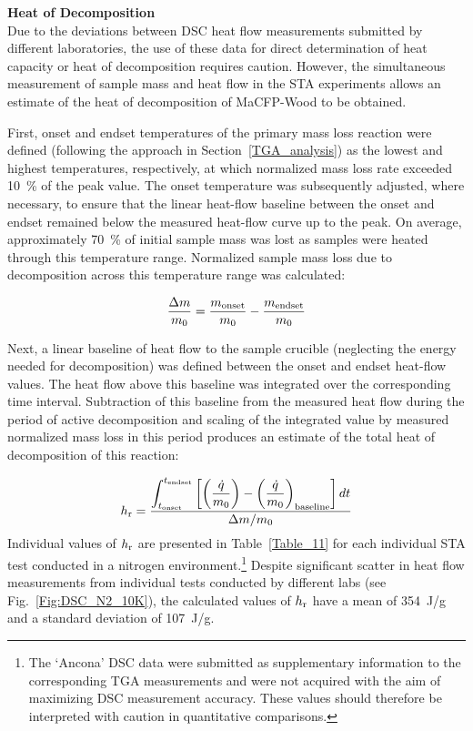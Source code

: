 \documentclass{book}
\begin{document}

\textbf{Heat of Decomposition} \\
Due to the deviations between DSC heat flow measurements submitted by different laboratories, the use of these data for direct determination of heat capacity or heat of decomposition requires caution. However, the simultaneous measurement of sample mass and heat flow in the STA experiments allows an estimate of the heat of decomposition of MaCFP-Wood to be obtained.

First, onset and endset temperatures of the primary mass loss reaction were defined (following the approach in Section~\ref{TGA_analysis}) as the lowest and highest temperatures, respectively, at which normalized mass loss rate exceeded 10~\% of the peak value. The onset temperature was subsequently adjusted, where necessary, to ensure that the linear heat-flow baseline between the onset and endset remained below the measured heat-flow curve up to the peak. On average, approximately 70~\% of initial sample mass was lost as samples were heated through this temperature range. Normalized sample mass loss due to decomposition across this temperature range was calculated:

\begin{equation}
\frac{\Delta m}{m_0}=\frac{m_{\rm onset}}{m_0}-\frac{m_{\rm endset}}{m_0}
\end{equation}

Next, a linear baseline of heat flow to the sample crucible (neglecting the energy needed for decomposition) was defined between the onset and endset heat-flow values. The heat flow above this baseline was integrated over the corresponding time interval. Subtraction of this baseline from the measured heat flow during the period of active decomposition and scaling of the integrated value by measured normalized mass loss in this period produces an estimate of the total heat of decomposition of this reaction:

\begin{equation}
h_{\rm r}=\frac{\displaystyle\int_{t_{\rm onset}}^{t_{\rm endset}}\left[\left(\frac{\dot{q}}{m_0}\right)-\left(\frac{\dot{q}}{m_0}\right)_{\rm baseline}\right]dt}{\Delta m/m_0}
\end{equation}
Individual values of $h_{\rm r}$ are presented in Table~\ref{Table_11} for each individual STA test conducted in a nitrogen environment.\footnote{The `Ancona' DSC data were submitted as supplementary information to the corresponding TGA measurements and were not acquired with the aim of maximizing DSC measurement accuracy. These values should therefore be interpreted with caution in quantitative comparisons.} Despite significant scatter in heat flow measurements from individual tests conducted by different labs (see Fig.~\ref{Fig:DSC_N2_10K}), the calculated values of $h_{\rm r}$ have a mean of 354~J/g and a standard deviation of 107~J/g.
\end{document}
